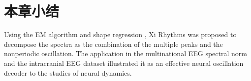 \section{本章小结}
Using the EM algorithm and shape regression , Xi Rhythms was proposed to decompose the spectra as the combination of the multiple peaks and the nonperiodic oscillation. The application in the multinational EEG spectral norm and the intracranial EEG dataset illustrated it as an effective neural oscillation decoder to the studies of neural dynamics.